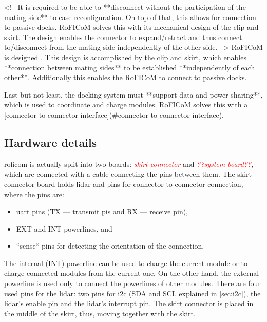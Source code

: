 \documentclass[
  digital,     %
  oneside,     %
  nosansbold,  %
  nocolorbold, %
  nolof,         %
  nolot,         %
]{fithesis4}
\newcommand{\TODO}[1]{\textcolor{red}{\textit{#1}}}
\newcommand{\TODOLIST}[1]{}
\begin{document}
{{{<!-- It is required to be able to **disconnect without the participation of the mating side** to ease reconfiguration. On top of
that, this allows for connection to passive docks. RoFICoM solves this with its mechanical design of the clip and skirt.
The design enables the connector to expand/retract and thus connect to/disconnect from the mating side independently
of the other side. -->
RoFICoM is designed . This design is accomplished by the clip and skirt, which enables **connection between mating sides** to be established **independently of each other**. Additionally this enables the RoFICoM to connect to passive docks.

Last but not least, the docking system must **support data and power
sharing**, which is used to coordinate and charge modules. RoFICoM solves this with a [connector-to-connector
interface](#connector-to-connector-interface).
\fi


\subsection{ Hardware details } \label{sec:roficom-hw}
\TODOLIST{
\begin{itemize}
    \item MCU
    \item motor
    \item \acrshort{uart}
    \item \acrshort{spi}
    \item \acrshort{i2c}
    \item EXT and INT power lines
\end{itemize}
}

\acrshort{roficom} is actually split into two boards: \TODO{skirt connector} and \TODO{??system board??}, which are connected with a cable connecting the pins between them. The skirt connector board holds \acrshort{lidar} and pins for connector-to-connector connection, where the pins are: 

\begin{itemize}
    \item \acrshort{uart} pins (TX --- transmit pis and RX --- receive pin),
    \item EXT and INT powerlines, and
    \item ``sense`` pins for detecting the orientation of the connection.
\end{itemize}

The internal (INT) powerline can be used to charge the current module or  to charge connected modules from the current one. On the other hand, the external powerline is used only to connect the powerlines of other modules. There are four used pins for the \acrshort{lidar}: two pins for \acrshort{i2c} (SDA and SCL explained in \autoref{sec:i2c}), the \acrshort{lidar}'s enable pin and the \acrshort{lidar}'s interrupt pin. The skirt connector is placed in the middle of the skirt, thus, moving together with the skirt.

}}}
\end{document}
